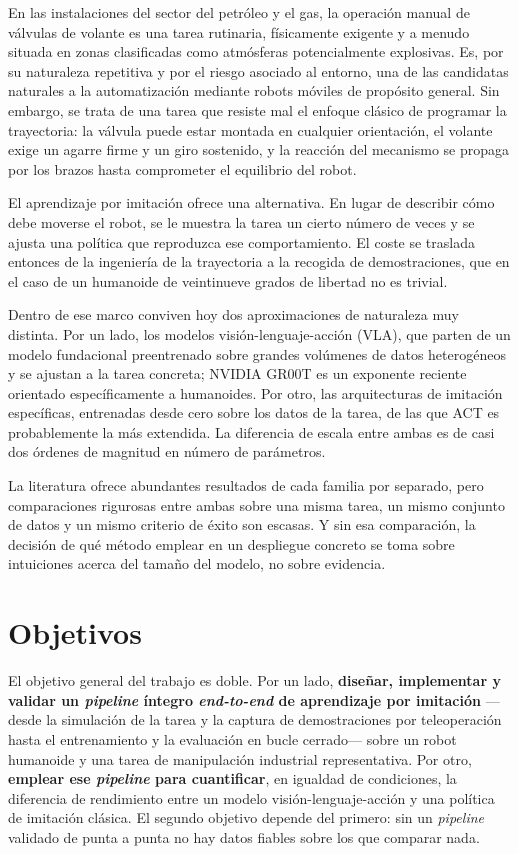 En las instalaciones del sector del petróleo y el gas, la operación manual de válvulas de volante es
una tarea rutinaria, físicamente exigente y a menudo situada en zonas clasificadas como atmósferas
potencialmente explosivas. Es, por su naturaleza repetitiva y por el riesgo asociado al entorno, una
de las candidatas naturales a la automatización mediante robots móviles de propósito general. Sin
embargo, se trata de una tarea que resiste mal el enfoque clásico de programar la trayectoria: la
válvula puede estar montada en cualquier orientación, el volante exige un agarre firme y un giro
sostenido, y la reacción del mecanismo se propaga por los brazos hasta comprometer el equilibrio del
robot.

El aprendizaje por imitación ofrece una alternativa. En lugar de describir cómo debe moverse el
robot, se le muestra la tarea un cierto número de veces y se ajusta una política que reproduzca ese
comportamiento. El coste se traslada entonces de la ingeniería de la trayectoria a la recogida de
demostraciones, que en el caso de un humanoide de veintinueve grados de libertad no es trivial.

Dentro de ese marco conviven hoy dos aproximaciones de naturaleza muy distinta. Por un lado, los
modelos visión-lenguaje-acción (VLA), que parten de un modelo fundacional preentrenado sobre
grandes volúmenes de datos heterogéneos y se ajustan a la tarea concreta; NVIDIA GR00T
\cite{nvidia2025gr00t} es un exponente reciente orientado específicamente a humanoides. Por otro,
las arquitecturas de imitación específicas, entrenadas desde cero sobre los datos de la tarea, de
las que ACT \cite{zhao2023aloha} es probablemente la más extendida. La diferencia de escala entre
ambas es de casi dos órdenes de magnitud en número de parámetros.

La literatura ofrece abundantes resultados de cada familia por separado, pero comparaciones
rigurosas entre ambas sobre una misma tarea, un mismo conjunto de datos y un mismo criterio de
éxito son escasas. Y sin esa comparación, la decisión de qué método emplear en un despliegue
concreto se toma sobre intuiciones acerca del tamaño del modelo, no sobre evidencia.


\section*{Objetivos}

El objetivo general del trabajo es doble. Por un lado, \textbf{diseñar, implementar y validar un
\textit{pipeline} íntegro \textit{end-to-end} de aprendizaje por imitación} —desde la simulación de
la tarea y la captura de demostraciones por teleoperación hasta el entrenamiento y la evaluación en
bucle cerrado— sobre un robot humanoide y una tarea de manipulación industrial representativa. Por
otro, \textbf{emplear ese \textit{pipeline} para cuantificar}, en igualdad de condiciones, la
diferencia de rendimiento entre un modelo visión-lenguaje-acción y una política de imitación
clásica. El segundo objetivo depende del primero: sin un \textit{pipeline} validado de punta a
punta no hay datos fiables sobre los que comparar nada.

